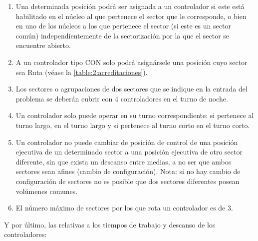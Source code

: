 \begin{enumerate}[resume*]
	\item \label{RD:acreditacion-valida} Una determinada posición podrá ser asignada a un controlador si este está habilitado en el núcleo al que pertenece el sector que le corresponde, o bien en uno de los núcleos a los que pertenece el sector
	(si este es un sector común) independientemente de la sectorización por la que el sector se encuentre abierto.
	
	\item A un controlador tipo CON solo podrá asignársele una posición cuyo sector sea Ruta (véase la \autoref{table:2:acreditaciones}).
	
	\item Los sectores o agrupaciones de dos sectores que se indique en la entrada del problema se deberán cubrir con 4 controladores en el turno	de noche.
	
	\item Un controlador solo puede operar en su turno correspondiente: si pertenece al turno largo, en el turno largo y si pertenece al turno corto en el turno corto.
	
	\item Un controlador no puede cambiar de posición de control de una posición ejecutiva de un determinado sector a una posición ejecutiva de otro sector diferente, sin que exista un descanso entre medias, a no ser que ambos sectores sean afines (cambio de configuración). Nota: si no hay cambio de configuración de sectores no es posible que dos sectores diferentes posean volúmenes comunes.
	
	\item El número máximo de sectores por los que rota un controlador es de 3.	
\end{enumerate}



Y por último, las relativas a los tiempos de trabajo y descanso de los controladores:

